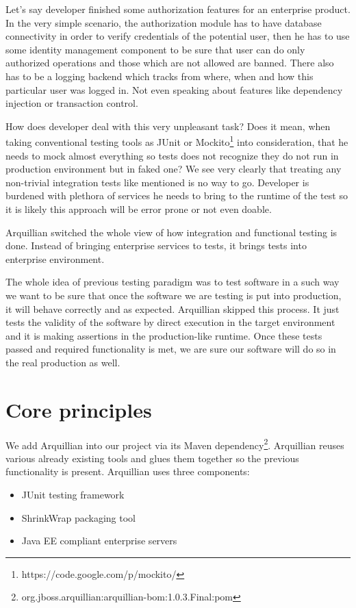 \documentclass[12pt,final,oneside]{fithesis}
\begin{document}
Let's say developer finished some authorization features for an enterprise product. In the very simple scenario, the authorization module has to have database connectivity in order to verify credentials of the potential user, then he has to use some identity management component to be sure that user can do only authorized operations and those which are not allowed are banned. There also has to be a logging backend which tracks from where, when and how this particular user was logged in. Not even speaking about features like dependency injection or transaction control.

How does developer deal with this very unpleasant task? Does it mean, when taking conventional testing tools as JUnit or Mockito\footnote{https://code.google.com/p/mockito/} into consideration, that he needs to mock almost everything so tests does not recognize they do not run in production environment but in faked one? We see very clearly that treating any non-trivial integration tests like mentioned is no way to go. Developer is burdened with plethora of services he needs to bring to the runtime of the test so it is likely this approach will be error prone or not even doable.
	
Arquillian switched the whole view of how integration and functional testing is done. Instead of bringing enterprise services to tests, it brings tests into enterprise environment.

The whole idea of previous testing paradigm was to test software in a such way we want to be sure that once the software we are testing is put into production, it will behave correctly and as expected. Arquillian skipped this process. It just tests the validity of the software by direct execution in the target environment and it is making assertions in the production-like runtime. Once these tests passed and required functionality is met, we are sure our software will do so in the real production as well.

	\section{Core principles}
	
We add Arquillian into our project via its Maven dependency\footnote{org.jboss.arquillian:arquillian-bom:1.0.3.Final:pom}. Arquillian reuses various already existing tools and glues them together so the previous functionality is present. Arquillian uses three components:

\begin{itemize}
	\item{JUnit testing framework}
	\item{ShrinkWrap packaging tool}
	\item{Java EE compliant enterprise servers}
\end{itemize}
\end{document}
